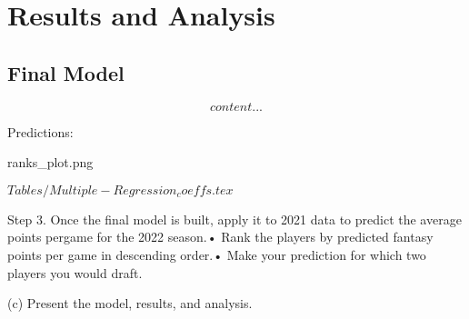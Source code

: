 \chapter{Results and Analysis}
\label{ch:results}
\glsresetall


\section{Final Model}


\begin{equation}
	content...
\end{equation}

Predictions:


ranks_plot.png

\(Tables/Multiple-Regression_coeffs.tex\)









Step 3. Once the final model is built, apply it to 2021 data to predict the average points pergame for the 2022 season.• Rank the players by predicted fantasy points per game in descending order.• Make your prediction for which two players you would draft.

(c) Present the model, results, and analysis.

